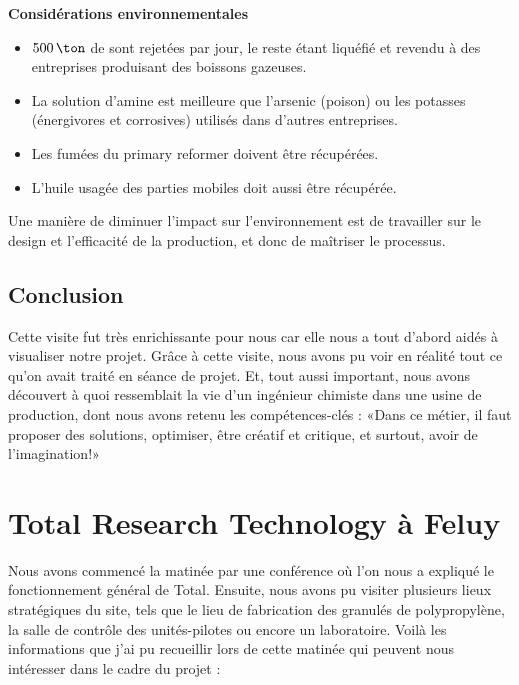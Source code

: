 \textbf{Considérations environnementales}
\begin{itemize}
\item $500\,\ton$ de  sont rejetées par jour, le reste étant liquéfié et revendu à des entreprises produisant des boissons gazeuses.
\item La solution d'amine est meilleure que l'arsenic (poison) ou les potasses (énergivores et corrosives) utilisés dans d'autres entreprises.
\item Les fumées du primary reformer doivent être récupérées.
\item L'huile usagée des parties mobiles doit aussi être récupérée.
\end{itemize}
Une manière de diminuer l'impact sur l'environnement est de
travailler sur le design et l'efficacité de la production,
et donc de maîtriser le processus.

\subsection{Conclusion}

Cette visite fut très enrichissante pour nous car elle nous a tout d'abord aidés à visualiser notre projet. Grâce à cette visite, nous avons pu voir en réalité tout ce qu'on avait traité en séance de projet.
Et, tout aussi important, nous avons découvert à quoi ressemblait la vie d'un ingénieur chimiste dans une usine de production, dont nous avons retenu les compétences-clés : «Dans ce métier, il faut proposer des solutions, optimiser, être créatif et critique, et surtout, avoir de l'imagination!» 

\section{Total Research Technology à Feluy}
Nous avons commencé la matinée par une conférence où l'on nous a expliqué le fonctionnement général de Total. Ensuite, nous avons pu visiter plusieurs lieux stratégiques du site, tels que le lieu de fabrication des granulés de polypropylène, la salle de contrôle des unités-pilotes ou encore un laboratoire.
Voilà les informations que j'ai pu recueillir lors de cette matinée qui peuvent nous intéresser dans le cadre du projet :
